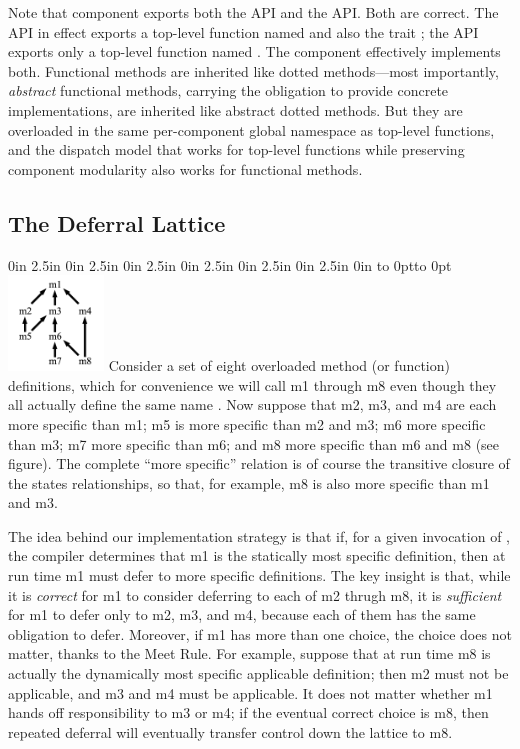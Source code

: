Note that component
 exports both the
 API and the
 API.  Both are correct.
The  API
in effect exports a top-level function named
 and also the trait ;
the  API
exports only a top-level function named
.  The component effectively
implements both.  Functional methods are inherited
like dotted methods---most importantly,
\emph{abstract} functional methods,
carrying the obligation to
provide concrete implementations,
are inherited like abstract dotted methods.
But they are overloaded in the same per-component
global namespace as top-level functions,
and the dispatch model that works for top-level
functions while preserving component modularity
also works for functional methods.

\subsection{The Deferral Lattice}

\leavevmode{} 0in 2.5in 0in 2.5in 0in 2.5in 0in 2.5in 0in 2.5in 0in 2.5in 0in \hsize
\hbox to 0pt{\hskip 2.3in\vbox to 0pt{\vskip-10pt\includegraphics[width=1in,bb=0 0 228 228]{hierarchy-cropped.png}\vss}\hss}\relax
Consider a set of eight overloaded method (or function) definitions,
which for convenience we will call m1 through m8 even though
they all actually define the same name .  Now suppose that m2, m3, and m4
are each more specific than m1; m5 is more specific than m2 and m3;
m6 more specific than m3; m7 more specific than m6;
and m8 more specific than m6 and m8 (see figure).
The complete ``more specific'' relation is of course the transitive closure
of the states relationships, so that, for example, m8 is also more specific
than m1 and m3.

The idea behind our implementation strategy is that if, for a given invocation of ,
the compiler determines that m1 is the statically most specific definition,
then at run time m1 must defer to more specific definitions.  The key insight is that,
while it is \emph{correct} for m1 to consider deferring to each of m2 thrugh m8,
it is \emph{sufficient} for m1 to defer only to m2, m3, and m4, because each of them
has the same obligation to defer.  Moreover, if m1 has more than one choice,
the choice does not matter, thanks to the Meet Rule.  For example, suppose that
at run time m8 is actually the dynamically most specific applicable definition;
then m2 must not be applicable, and m3 and m4 must be applicable.  It does not matter
whether m1 hands off responsibility to m3 or m4; if the eventual correct choice is m8,
then repeated deferral will eventually transfer control down the lattice to m8.

